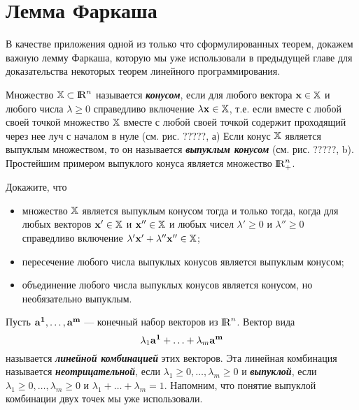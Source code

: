 \section{Лемма Фаркаша}

    В качестве приложения одной из только что сформулированных теорем, докажем важную
    лемму Фаркаша, которую мы уже использовали в предыдущей главе для доказательства
    некоторых теорем линейного программирования.


    Множество $\mathbb{X}\subset{\rm I\!R}^{n}$ называется \emph{\textbf{конусом}}, если для
    любого вектора $\mathbf{x}\in\mathbb{X}$ и любого числа
    $\lambda\geqslant0$ справедливо включение
     $\lambda\mathbf{x}\in\mathbb{X}$, т.е. если вместе с любой своей точкой множество
     $\mathbb{X}$ вместе с любой своей точкой содержит проходящий через
     нее луч с началом в нуле (см. рис. ?????, а)
     Если конус $\mathbb{X}$ является выпуклым
     множеством, то он называется \emph{\textbf{выпуклым конусом}} (см. рис. ?????, b).
     Простейшим примером выпуклого конуса является множество ${\rm I\!R}_{+}^{n}$.


\begin{exer}
    Докажите, что
    \begin{itemize}
      \item множество $\mathbb{X}$ является выпуклым конусом
    тогда и только тогда, когда для любых векторов $\mathbf{x'}\in\mathbb{X}$
    и $\mathbf{x''}\in\mathbb{X}$ и любых чисел $\lambda'\geqslant0$ и
    $\lambda''\geqslant0$ справедливо включение
    $\lambda'\mathbf{x'}+\lambda''\mathbf{x''}\in\mathbb{X}$;
      \item пересечение любого числа выпуклых конусов является выпуклым
      конусом;
      \item объединение любого числа выпуклых конусов является конусом,
      но необязательно выпуклым.
    \end{itemize}

\end{exer}


    Пусть $\mathbf{a^{1}},\ldots,\mathbf{a^{m}}$ --- конечный набор векторов из
    ${\rm I\!R}^{n}$. Вектор вида
    \[\lambda_{1}\mathbf{a^{1}}+\ldots+\lambda_{m}\mathbf{a^{m}}\] называется
    \textbf{\emph{линейной комбинацией}} этих векторов. Эта
    линейная комбинация называется \emph{\textbf{неотрицательной}}, если
    $\lambda_{1}\geqslant0,\ldots,\lambda_{m}\geqslant0$ и \emph{\textbf{выпуклой}},
    если $\lambda_{1}\geqslant0,\ldots,\lambda_{m}\geqslant0$ и
    $\lambda_{1}+\ldots+\lambda_{m}=1$. Напомним, что понятие выпуклой комбинации двух точек
    мы уже использовали.




